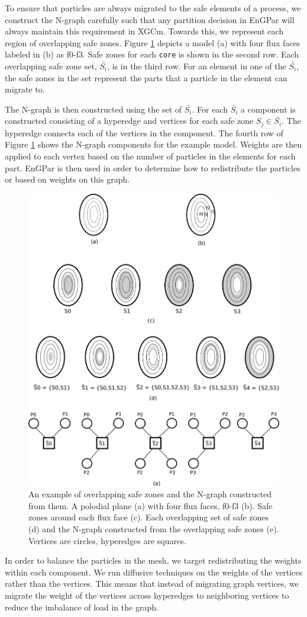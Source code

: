 \documentclass[conference]{IEEEtran}
\begin{document}
To ensure that particles are always migrated to the safe elements
of a process, we construct the N-graph carefully such that any partition
decision in EnGPar will always maintain this requirement in XGCm. Towards this,
we represent each region
of overlapping safe zones. Figure \ref{fig:sbars} depicts a model (a) with four flux faces labeled
in (b) as f0-f3. Safe zones for each \texttt{core} is shown in the second row.
Each overlapping safe zone set, $\bar{S_i}$, is in the third row. For an element in
one of the $\bar{S_i}$, the safe zones in the set represent the parts that a particle in
the element can migrate to.

The N-graph is then constructed using the set of $\bar{S_i}$. For each $\bar{S_i}$ a
component is constructed consisting of a hyperedge and vertices for each safe zone
$S_j \in \bar{S_i}$. The hyperedge connects each of the vertices in the component.
The fourth row of Figure \ref{fig:sbars} shows the N-graph components for the example model.
Weights are then applied to each vertex based on the number of particles in the elements
for each part. 
EnGPar is then used in order to determine how to redistribute the particles or
based on weights on this graph.

\begin{figure}[!ht]
  \centering
  \includegraphics[width=.4\textwidth]{../figures/xgcm_ngraph_construction.png}
  \caption{An example of overlapping safe zones and the N-graph constructed from
  them. A polodial plane (a) with four flux faces, f0-f3 (b). Safe zones around each flux face (c). Each overlapping set of safe zones (d) and the N-graph constructed from the overlapping safe zones (e). Vertices are circles, hyperedges are squares.}
  \label{fig:sbars}
\end{figure}

In order to balance the particles in the mesh, we target redistributing the weights within
each component. We run diffusive techniques on the weights of the vertices
rather than the vertices. This means that instead of migrating graph vertices, we migrate the
weight of the vertices across hyperedges to neighboring vertices to reduce the imbalance
of load in the graph.
\end{document}
